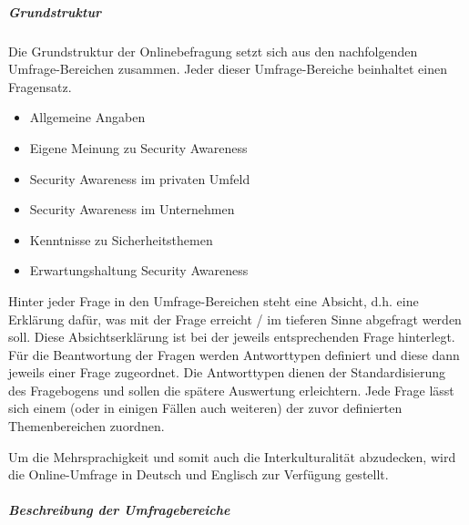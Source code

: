 \documentclass[../../main.tex]{subfiles}
\begin{document}
\subparagraph*{Grundstruktur}\mbox{}

\begin{sloppypar}
Die Grundstruktur der Onlinebefragung setzt sich aus den nachfolgenden Umfrage-Bereichen zusammen. Jeder dieser Umfrage-Bereiche beinhaltet einen Fragensatz.

\begin{itemize}
  \item Allgemeine Angaben
  \item Eigene Meinung zu Security Awareness
  \item Security Awareness im privaten Umfeld
  \item Security Awareness im Unternehmen
  \item Kenntnisse zu Sicherheitsthemen
  \item Erwartungshaltung Security Awareness
\end{itemize}
 
Hinter jeder Frage in den Umfrage-Bereichen steht eine Absicht, d.h. eine Erklärung dafür, was mit der Frage erreicht / im tieferen Sinne abgefragt werden soll. Diese Absichtserklärung ist bei der jeweils entsprechenden Frage hinterlegt. Für die Beantwortung der Fragen werden Antworttypen definiert und diese dann jeweils einer Frage zugeordnet. Die Antworttypen dienen der Standardisierung des Fragebogens und sollen die spätere Auswertung erleichtern. Jede Frage lässt sich einem (oder in einigen Fällen auch weiteren) der zuvor definierten Themenbereichen zuordnen.

Um die Mehrsprachigkeit und somit auch die Interkulturalität abzudecken, wird die Online-Umfrage in Deutsch und Englisch zur Verfügung gestellt.

\end{sloppypar}

\subparagraph*{Beschreibung der Umfragebereiche}\mbox{}


\sloppy 
\end{document}
